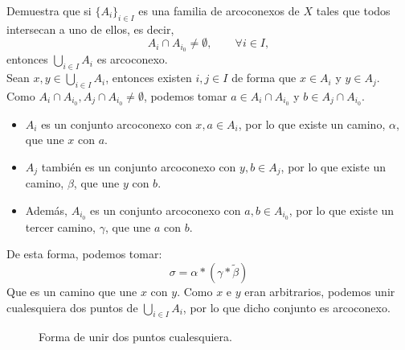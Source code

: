 \begin{ejercicio}
    Demuestra que si $\{A_i\}_{i \in I}$ es una familia de arcoconexos de $X$ tales que todos intersecan a uno de ellos, es decir,
    \begin{equation*}
        A_i\cap A_{i_0} \neq \emptyset, \qquad \forall i \in I,
    \end{equation*}
    entonces $\bigcup\limits_{i \in I}A_i$ es arcoconexo.\\

    \noindent
    Sean $x,y\in \bigcup\limits_{i \in I}A_i$, entonces existen $i,j\in I$ de forma que $x\in A_i$ y $y\in A_j$. Como $A_i \cap A_{i_0}, A_j\cap A_{i_0}\neq \emptyset $, podemos tomar $a\in A_i\cap A_{i_0}$ y $b\in A_j\cap A_{i_0}$.
    \begin{itemize}
        \item $A_i$ es un conjunto arcoconexo con $x,a\in A_i$, por lo que existe un camino, $\alpha$, que une $x$ con $a$.
        \item $A_j$ también es un conjunto arcoconexo con $y,b\in A_j$, por lo que existe un camino, $\beta$, que une $y$ con $b$.
        \item Además, $A_{i_0}$ es un conjunto arcoconexo con $a,b\in A_{i_0}$, por lo que existe un tercer camino, $\gamma$, que une $a$ con $b$.
    \end{itemize}
    De esta forma, podemos tomar:
    \begin{equation*}
        \sigma = \alpha \ast \left(\gamma \ast \tilde{\beta}\right)
    \end{equation*}
    Que es un camino que une $x$ con $y$. Como $x$ e $y$ eran arbitrarios, podemos unir cualesquiera dos puntos de $\bigcup\limits_{i \in I}A_i$, por lo que dicho conjunto es arcoconexo.

    \begin{figure}[H]
        \centering
        \caption{Forma de unir dos puntos cualesquiera.}
    \end{figure}
\end{ejercicio}

